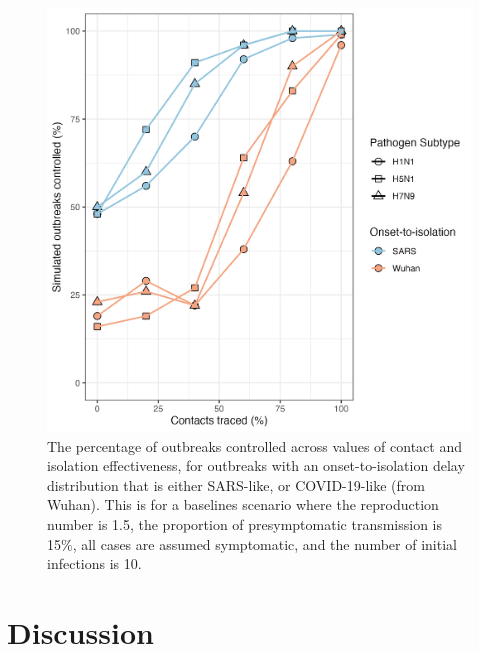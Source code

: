 \documentclass{article}
\begin{document}
\clearpage

\begin{figure}[ht]
\centering
\includegraphics[width=\textwidth]{../plots/prop_outbreak_control_onset_to_isolation.png}
\caption{The percentage of outbreaks controlled across values of contact and isolation effectiveness, for outbreaks with an onset-to-isolation delay distribution that is either SARS-like, or COVID-19-like (from Wuhan). This is for a baselines scenario where the reproduction number is 1.5, the proportion of presymptomatic transmission is 15\%, all cases are assumed symptomatic, and the number of initial infections is 10.}
\label{fig:prop-outbreak-control-onset-to-isolation}
\end{figure}

\section*{Discussion}
\end{document}
